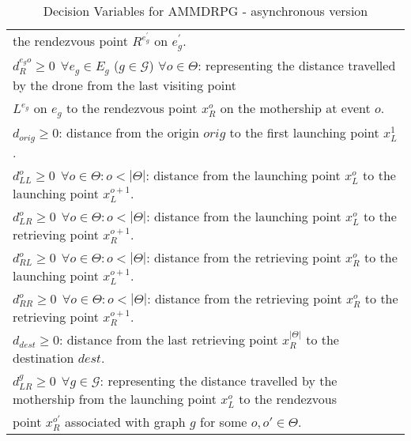 \begin{table}[h]
\begin{tabular}{|l|}
\hspace*{1cm}  the rendezvous point $R^{e^\prime_g}$ on $e^\prime_g$.\\
$d_R^{e_g o} \geq 0 \:\: \forall e_g \in E_g$ ($g \in \mathcal{G}$) $\forall o \in \Theta$: representing the distance travelled by the drone from the last visiting point\\
\hspace*{1cm} $L^{e_g}$ on $e_g$ to the rendezvous point $x_R^o$ on the mothership at event $o$.\\
$d_{orig}\geq 0$: distance from the origin $orig$ to the first launching point $x_L^1$.\\
$d_{LL}^o\geq 0 \:\: \forall o \in \Theta:o<|\Theta|$: distance from the launching point $x_L^o$ to the launching point $x_L^{o+1}$.\\
$d_{LR}^o\geq 0 \:\: \forall o \in \Theta:o<|\Theta|$: distance from the launching point $x_L^o$ to the retrieving point $x_R^{o+1}$.\\
$d_{RL}^o\geq 0 \:\: \forall o \in \Theta:o<|\Theta|$: distance from the retrieving point $x_R^o$ to the launching point $x_L^{o+1}$.\\
$d_{RR}^o\geq 0 \:\: \forall o \in \Theta:o<|\Theta|$: distance from the retrieving point $x_R^o$ to the retrieving point $x_R^{o+1}$.\\
$d_{dest}\geq 0$: distance from the last retrieving point $x_R^{|\Theta|}$ to the destination $dest$.\\
$d_{LR}^g\geq 0 \:\: \forall g \in\mathcal G$: representing the distance travelled by the mothership from the launching point $x_L^o$ to the rendezvous\\
\hspace*{1cm} point $x_R^{o'}$ associated with graph $g$ for some $o, o' \in \Theta$.
\hline
\end{tabular}
\caption{Decision Variables for AMMDRPG - asynchronous version }
\label{table:t3}
\end{table}

\clearpage



